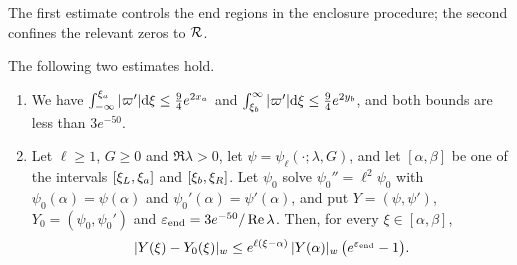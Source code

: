 The first estimate controls the end regions in the enclosure procedure;
the second confines the relevant zeros to $\mathcal{R}$.

\begin{lemma}
\label{lem:end-regions}
The following two estimates hold.
\begin{enumerate}[label=\textup{(\arabic*)}]
\item We have $\int_{-\infty}^{\xi_a}|\varpi'|\dd\xi\le\frac94e^{2x_a}$ and
  $\int_{\xi_b}^{\infty}|\varpi'|\dd\xi\le\frac94e^{2y_b}$, and both bounds are less
  than $3e^{-50}$.
\item Let $\ell\ge1$, $G\ge0$ and $\Re\lambda>0$, let $\psi=\psi_\ell(\cdot;\lambda,G)$,
  and let $[\alpha,\beta]$ be one of the intervals $[\xi_L,\xi_a]$ and $[\xi_b,\xi_R]$.
  Let $\psi_0$ solve $\psi_0''=\ell^2\psi_0$ with $\psi_0(\alpha)=\psi(\alpha)$ and
  $\psi_0'(\alpha)=\psi'(\alpha)$, and put $Y=(\psi,\psi')$, $Y_0=(\psi_0,\psi_0')$
  and $\varepsilon_{\mathrm{end}}=3e^{-50}/\Re\lambda$. Then, for every $\xi\in[\alpha,\beta]$,
  \[
  |Y(\xi)-Y_0(\xi)|_w\le e^{\ell(\xi-\alpha)}\,|Y(\alpha)|_w\,\big(e^{\varepsilon_{\mathrm{end}}}-1\big).
  \]
\end{enumerate}
\end{lemma}
